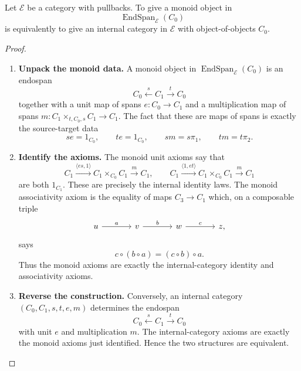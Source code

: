 \begin{theorem}
\label{thm:endospan-monoids-internal-categories}
    Let \(\mathcal E\) be a category with pullbacks. To give a monoid object in
    \[
        \operatorname{EndSpan}_{\mathcal E}(C_0)
    \]
    is equivalently to give an internal category in \(\mathcal E\) with object-of-objects \(C_0\).
\end{theorem}
\begin{proof}
    \leavevmode
    \begin{enumerate}
        \item \textbf{Unpack the monoid data.} A monoid object in \(\operatorname{EndSpan}_{\mathcal E}(C_0)\) is an
        endospan
        \[
            C_0\xleftarrow{s}C_1\xrightarrow{t}C_0
        \]
        together with a unit map of spans \(e:C_0\to C_1\) and a multiplication map of spans \(m:C_1\times_{t,C_0,s}C_1\to C_1\). The fact that these are maps of spans is exactly the source-target data
        \[
            se=1_{C_0},
            \qquad
            te=1_{C_0},
            \qquad
            sm=s\pi_1,
            \qquad
            tm=t\pi_2.
        \]

        \item \textbf{Identify the axioms.} The monoid unit axioms say that
        \[
            C_1
                \xrightarrow{\langle es,1\rangle}
            C_1\times_{C_0}C_1
                \xrightarrow{m}
            C_1,
            \qquad
            C_1
                \xrightarrow{\langle 1,et\rangle}
            C_1\times_{C_0}C_1
                \xrightarrow{m}
            C_1
        \]
        are both \(1_{C_1}\). These are precisely the internal identity laws. The monoid associativity axiom is the equality of maps \(C_3\to C_1\) which, on a composable triple
        \[
            \begin{tikzcd}[column sep=large]
                    u 
                        \arrow[r, "a"] 
                & 
                    v 
                        \arrow[r, "b"] 
                & 
                    w 
                        \arrow[r, "c"] 
                & 
                    z,
            \end{tikzcd}
        \]
        says
        \[
            c\circ(b\circ a)=(c\circ b)\circ a.
        \]
        Thus the monoid axioms are exactly the internal-category identity and associativity axioms.

        \item \textbf{Reverse the construction.} Conversely, an internal category \((C_0,C_1,s,t,e,m)\) determines the endospan
        \[
            C_0\xleftarrow{s}C_1\xrightarrow{t}C_0
        \]
        with unit \(e\) and multiplication \(m\). The internal-category axioms are exactly the monoid axioms just identified. Hence the two structures are equivalent.
    \end{enumerate}
\end{proof}

